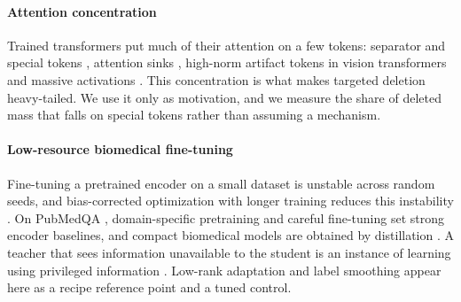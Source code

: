\paragraph{Attention concentration}
Trained transformers put much of their attention on a few tokens: separator and special tokens
\citep{clark2019bert}, attention sinks \citep{xiao2024sinks,gu2025sinks}, high-norm artifact tokens in vision transformers
\citep{darcet2024registers} and massive activations \citep{sun2024massive}. This concentration is what makes
targeted deletion heavy-tailed. We use it only as motivation, and we measure the share of deleted mass that
falls on special tokens rather than assuming a mechanism.

\paragraph{Low-resource biomedical fine-tuning}
Fine-tuning a pretrained encoder on a small dataset is unstable across random seeds, and bias-corrected
optimization with longer training reduces this instability \citep{dodge2020finetuning,mosbach2021stability,zhang2021revisiting}.
On PubMedQA \citep{jin2019pubmedqa}, domain-specific pretraining \citep{gu2021domain,yasunaga2022linkbert} and
careful fine-tuning \citep{tinn2023finetuning} set strong encoder baselines, and compact biomedical
models are obtained by distillation \citep{hinton2015distilling,rohanian2023compact}. A teacher that sees information
unavailable to the student is an instance of learning using privileged information
\citep{vapnik2009new,lopezpaz2016unifying}. Low-rank adaptation \citep{hu2022lora} and label smoothing \citep{muller2019label}
appear here as a recipe reference point and a tuned control.

